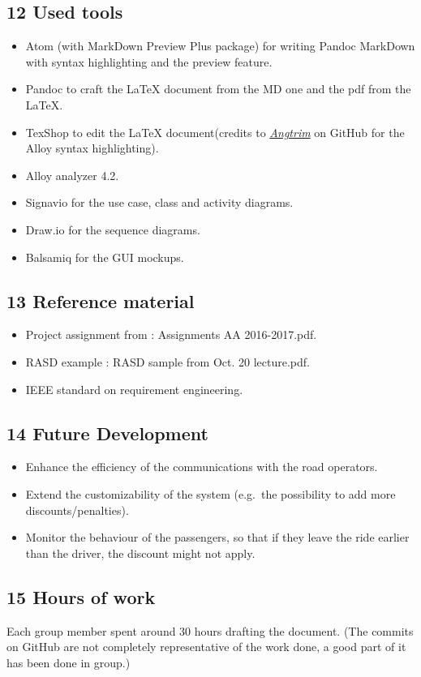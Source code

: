 \documentclass[]{article}
\providecommand{\tightlist}{%
  \setlength{\itemsep}{0pt}\setlength{\parskip}{0pt}}
\begin{document}
\newpage

\subsection{12 Used tools}\label{used-tools}

\begin{itemize}
\tightlist
\item
  Atom (with MarkDown Preview Plus package) for writing Pandoc MarkDown
  with syntax highlighting and the preview feature.
\item
  Pandoc to craft the LaTeX document from the MD one and the pdf from
  the LaTeX.
\item
  TexShop to edit the LaTeX document(credits to
  \href{https://github.com/Angtrim/alloy-latex-highlighting}{\emph{Angtrim}}
  on GitHub for the Alloy syntax highlighting).
\item
  Alloy analyzer 4.2.
\item
  Signavio for the use case, class and activity diagrams.
\item
  Draw.io for the sequence diagrams.
\item
  Balsamiq for the GUI mockups.
\end{itemize}

\subsection{13 Reference material}\label{reference-material}

\begin{itemize}
\tightlist
\item
  Project assignment from : Assignments AA 2016-2017.pdf.
\item
  RASD example : RASD sample from Oct. 20 lecture.pdf.
\item
  IEEE standard on requirement engineering.
\end{itemize}

\subsection{14 Future Development}\label{future-development}

\begin{itemize}
\tightlist
\item
  Enhance the efficiency of the communications with the road operators.
\item
  Extend the customizability of the system (e.g.~the possibility to add
  more discounts/penalties).
\item
  Monitor the behaviour of the passengers, so that if they leave the
  ride earlier than the driver, the discount might not apply.
\end{itemize}

\subsection{15 Hours of work}\label{hours-of-work}

Each group member spent around 30 hours drafting the document. (The
commits on GitHub are not completely representative of the work done, a
good part of it has been done in group.)
\end{document}
